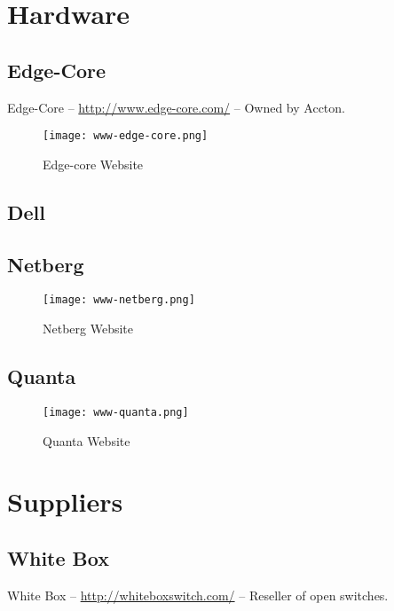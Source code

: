 \section{Hardware}

\subsection{Edge-Core}
Edge-Core -- \url{http://www.edge-core.com/} -- Owned by Accton.

\begin{figure}[h!]
\texttt{[image: www-edge-core.png]}
 \caption{Edge-core Website}
 \label{fig:www-edge-core}
\end{figure}


\subsection{Dell}


\subsection{Netberg}

\begin{figure}[h!]
\texttt{[image: www-netberg.png]}
 \caption{Netberg Website}
 \label{fig:www-netberg}
\end{figure}


\subsection{Quanta}

\begin{figure}[h!]
\texttt{[image: www-quanta.png]}
 \caption{Quanta Website}
 \label{fig:www-quanta}
\end{figure}


\section{Suppliers}

\subsection{White Box}
White Box -- \url{http://whiteboxswitch.com/} -- Reseller of open switches.

